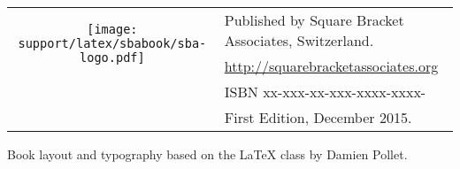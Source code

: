\documentclass[10pt,twoside,english,showtrims]{support/latex/sbabook/sbabook}
\begin{document}
{  \vfill

  \begin{tabular}{@{}c@{\quad}l}
    \multirow{2}{*}{\texttt{[image: support/latex/sbabook/sba-logo.pdf]}}
    & Published by Square Bracket Associates, Switzerland. \\
    & \url{http://squarebracketassociates.org} \\[\smallskipamount]
    & ISBN xx-xxx-xx-xxx-xxxx-xxxx- \\
    & First Edition, December 2015. \\%
  \end{tabular}
  \medskip

  Book layout and typography based on the  \LaTeX{} class by Damien Pollet.
}


\frontmatter
\pagestyle{plain}


%

\tableofcontents

\mainmatter



















\backmatter

\end{document}
